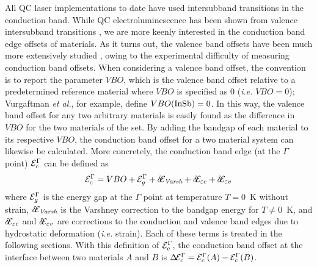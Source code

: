 All QC laser implementations to date have used intersubband transitions in the conduction band.  While QC electroluminescence has been shown from valence intersubband transitions \cite{Dehlinger:Science:2000:Sige} \cite{Malis:APL:2006}, we are more keenly interested in the conduction band edge offsets of materials.  As it turns out, the valence band offsets have been much more extensively studied \cite{Vurgaftman}, owing to the experimental difficulty of measuring conduction band offsets.  When considering a valence band offset, the convention is to report the parameter $VBO$, which is the valence band offset relative to a predetermined reference material where $VBO$ is specified as 0 (\emph{i.e.} $VBO=0$); Vurgaftman \emph{et al.}, for example, define $VBO(\textnormal{InSb})=0$.  In this way, the valence band offset for any two arbitrary materials is easily found as the difference in $VBO$ for the two materials of the set.  By adding the bandgap of each material to its respective $VBO$, the conduction band offset for a two material system can likewise be calculated.  More concretely, the conduction band edge (at the $\Gamma$ point) $\EE_c^\Gamma$ can be defined as
\begin{equation}
\EE_c^\Gamma = VBO + \EE_g^\Gamma + \delta\!\EE_\textit{Varsh} + \delta\!\EE_{\varepsilon c} + \delta\!\EE_{\varepsilon v}
\end{equation}
where $\EE_g^\Gamma$ is the energy gap at the $\Gamma$ point at temperature $T=0$~K without strain, $\delta\!\EE_\textit{Varsh}$ is the Varshney correction to the bandgap energy for $T\neq0$~K, and $\delta\!\EE_{\varepsilon c}$ and $\delta\!\EE_{\varepsilon v}$ are corrections to the conduction and valence band edges due to hydrostatic deformation (\emph{i.e.} strain).  Each of these terms is treated in the following sections.  With this definition of $\EE_c^\Gamma$, the conduction band offset at the interface between two materials $A$ and $B$ is $\Delta\!\EE_c^\Gamma=\EE_c^\Gamma(A)-\EE_c^\Gamma(B)$.




